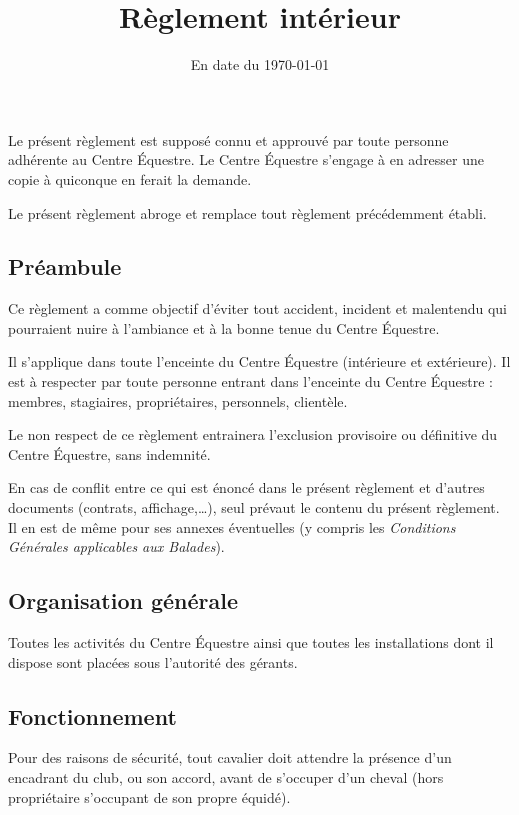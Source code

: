 \documentclass[11pt,a4paper]{article}
\title[Règlement intérieur -- version du \today]{Règlement intérieur}
\subtitle{En date du \today}
\author{}
\date{}
\begin{document}
\maketitle


Le présent règlement est supposé connu et approuvé par toute personne adhérente au Centre Équestre.
Le Centre Équestre s'engage à en adresser une copie à quiconque en ferait la demande.

Le présent règlement abroge et remplace tout règlement précédemment établi.

\subsection*{Préambule}

Ce règlement a comme objectif d'éviter tout accident, incident et malentendu qui pourraient nuire à l'ambiance et à la bonne tenue du Centre Équestre.

Il s'applique dans toute l'enceinte du Centre Équestre (intérieure et extérieure).
Il est à respecter par toute personne entrant dans l'enceinte du Centre Équestre : membres, stagiaires, propriétaires, personnels, clientèle.

Le non respect de ce règlement entrainera l'exclusion provisoire ou définitive du Centre Équestre, sans indemnité.

En cas de conflit entre ce qui est énoncé dans le présent règlement et d'autres documents (contrats, affichage,\dots), seul prévaut le contenu du présent règlement.
Il en est de même pour ses annexes éventuelles (y compris les \textit{Conditions Générales applicables aux Balades}).

\subsection{Organisation générale}
Toutes les activités du Centre Équestre ainsi que toutes les installations dont il dispose sont placées sous l'autorité des gérants.

\subsection{Fonctionnement}
Pour des raisons de sécurité, tout cavalier doit attendre la présence d'un encadrant du club, ou son accord, avant de s'occuper d'un cheval (hors propriétaire s'occupant de son propre équidé).
\end{document}
